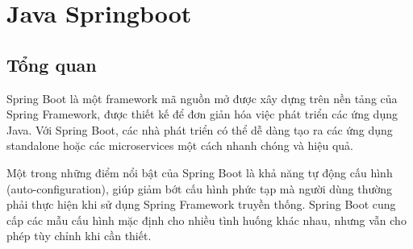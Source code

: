 \documentclass[../DoAn.tex]{subfiles}
\begin{document}






\section{Java Springboot}
\label{section:3.1}
\subsection{Tổng quan}
\label{subsection:3.1.1}
Spring Boot \cite{springboot} là một framework mã nguồn mở được xây dựng trên nền tảng của Spring Framework, được thiết kế để đơn giản hóa việc phát triển các ứng dụng Java. Với Spring Boot, các nhà phát triển có thể dễ dàng tạo ra các ứng dụng standalone hoặc các microservices một cách nhanh chóng và hiệu quả.

Một trong những điểm nổi bật của Spring Boot là khả năng tự động cấu hình (auto-configuration), giúp giảm bớt cấu hình phức tạp mà người dùng thường phải thực hiện khi sử dụng Spring Framework truyền thống. Spring Boot cung cấp các mẫu cấu hình mặc định cho nhiều tình huống khác nhau, nhưng vẫn cho phép tùy chỉnh khi cần thiết.
\end{document}
